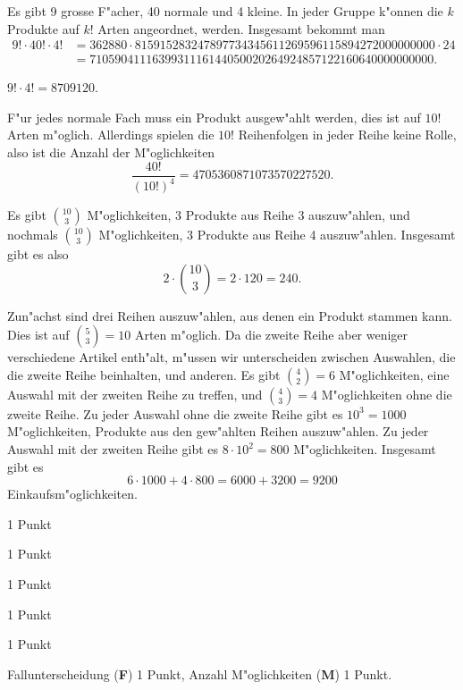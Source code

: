 \begin{loesung}
\begin{teilaufgaben}
\item Es gibt 9 grosse F"acher, 40 normale und 4 kleine. In jeder Gruppe
k"onnen die $k$ Produkte auf $k!$ Arten angeordnet, werden. Insgesamt 
bekommt man
\begin{align*}
9!\cdot 40!\cdot 4!&=
362880\cdot 815915283247897734345611269596115894272000000000 \cdot 24
\\
&=7105904111639931116144050020264924857122160640000000000.
\end{align*}
\item $9!\cdot 4!=8709120$.
\item
F"ur jedes normale Fach muss ein Produkt ausgew"ahlt werden, dies ist
auf $10!$ Arten m"oglich. Allerdings spielen die $10!$ Reihenfolgen
in jeder Reihe keine Rolle, also ist die Anzahl der M"oglichkeiten
\[
\frac{40!}{(10!)^4}=4705360871073570227520.
\]
\item
Es gibt $\binom{10}{3}$ M"oglichkeiten, $3$ Produkte aus Reihe 3
auszuw"ahlen, und nochmals $\binom{10}{3}$ M"oglichkeiten, $3$ Produkte
aus Reihe 4 auszuw"ahlen. Insgesamt gibt es also 
\[
2\cdot\binom{10}{3}=2\cdot 120=240.
\]
\item
Zun"achst sind drei Reihen auszuw"ahlen, aus denen ein Produkt stammen
kann.
Dies ist auf $\binom{5}{3}=10$ Arten m"oglich.
Da die zweite Reihe aber weniger verschiedene Artikel enth"alt, m"ussen
wir unterscheiden zwischen Auswahlen, die die zweite Reihe beinhalten,
und anderen.
Es gibt $\binom{4}{2}=6$ M"oglichkeiten, eine Auswahl mit der zweiten
Reihe zu treffen, und $\binom{4}{3}=4$ M"oglichkeiten ohne die zweite Reihe.
Zu jeder Auswahl ohne die zweite Reihe gibt es $10^3=1000$ M"oglichkeiten,
Produkte aus den gew"ahlten Reihen auszuw"ahlen.
Zu jeder Auswahl mit der zweiten Reihe gibt es $8\cdot 10^2=800$ M"oglichkeiten.
Insgesamt gibt es 
\[
6\cdot 1000
+
4\cdot 800
=6000 + 3200=9200
\]
Einkaufsm"oglichkeiten.
\end{teilaufgaben}
\end{loesung}

\begin{bewertung}
\begin{teilaufgaben}
\item 1 Punkt
\item 1 Punkt
\item 1 Punkt
\item 1 Punkt
\item 1 Punkt
\item Fallunterscheidung (\textbf{F}) 1 Punkt,
Anzahl M"oglichkeiten (\textbf{M}) 1 Punkt.
\end{teilaufgaben}
\end{bewertung}

